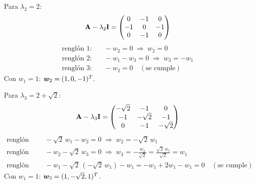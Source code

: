 Para $\lambda_2 = 2$:
\[
\mathbf{A} - \lambda_2\mathbf{I} =
\begin{pmatrix} 0 & -1 & 0\\ -1 & 0 & -1\\ 0 & -1 & 0 \end{pmatrix}
\]
\begin{align*}
	\text{renglón 1:}&\quad -w_2 = 0 \;\Longrightarrow\; w_2 = 0\\
	\text{renglón 2:}&\quad -w_1 - w_3 = 0 \;\Longrightarrow\; w_3 = -w_1\\
	\text{renglón 3:}&\quad -w_2 = 0 \quad (\text{se cumple})
\end{align*}
Con $w_1 = 1$: $\bm{w}_2 = (1, 0, -1)^T$.

Para $\lambda_3 = 2 + \sqrt2$:
\[
\mathbf{A} - \lambda_3\mathbf{I} =
\begin{pmatrix} -\sqrt2 & -1 & 0\\ -1 & -\sqrt2 & -1\\ 0 & -1 & -\sqrt2 \end{pmatrix}
\]
\begin{align*}
	\text{renglón 1:}&\quad -\sqrt2\,w_1 - w_2 = 0 \;\Longrightarrow\; w_2 = -\sqrt2\,w_1\\
	\text{renglón 3:}&\quad -w_2 - \sqrt2\,w_3 = 0 \;\Longrightarrow\; w_3 = -\frac{w_2}{\sqrt2} = \frac{\sqrt2\,w_1}{\sqrt2} = w_1\\
	\text{renglón 2:}&\quad -w_1 - \sqrt2\,(-\sqrt2\,w_1) - w_1 = -w_1 + 2w_1 - w_1 = 0 \quad (\text{se cumple})
\end{align*}
Con $w_1 = 1$: $\bm{w}_3 = (1, -\sqrt2, 1)^T$.





